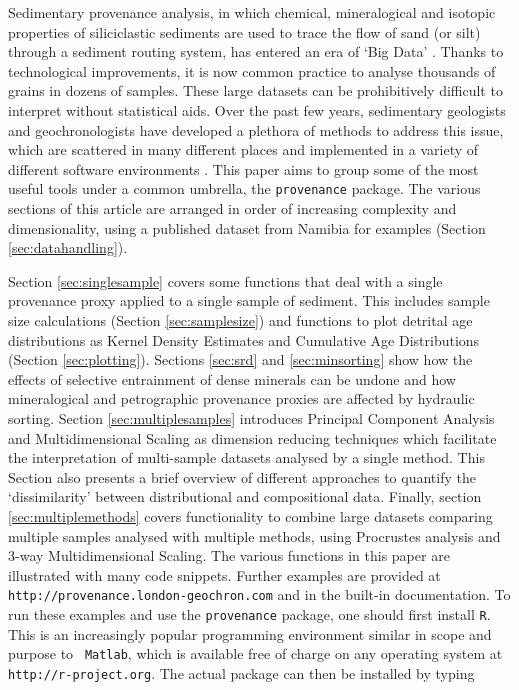 \documentclass{article}
\begin{document}
Sedimentary provenance analysis, in which chemical, mineralogical and
isotopic properties of siliciclastic sediments are used to trace the
flow of sand (or silt) through a sediment routing system, has entered
an era of `Big Data' \citep{vermeesch2015}. Thanks to technological
improvements, it is now common practice to analyse thousands of grains
in dozens of samples. These large datasets can be prohibitively
difficult to interpret without statistical aids. Over the past few
years, sedimentary geologists and geochronologists have developed a
plethora of methods to address this issue, which are scattered in many
different places and implemented in a variety of different software
environments \citep[e.g.,][]{ludwig2003, marshall1996, sircombe2004a,
  sircombe2004b, resentini2013, templ2011, vandenboogaart2008,
  vermeesch2004b, vermeesch2012b, vermeesch2013, vermeesch2015}. This
paper aims to group some of the most useful tools under a common
umbrella, the {\tt provenance} package. The various sections of this
article are arranged in order of increasing complexity and
dimensionality, using a published dataset from Namibia for examples
(Section \ref{sec:datahandling}).

Section \ref{sec:singlesample} covers some functions that deal with a
single provenance proxy applied to a single sample of sediment.  This
includes sample size calculations (Section \ref{sec:samplesize}) and
functions to plot detrital age distributions as Kernel Density
Estimates and Cumulative Age Distributions (Section
\ref{sec:plotting}). Sections \ref{sec:srd} and \ref{sec:minsorting}
show how the effects of selective entrainment of dense minerals can be
undone and how mineralogical and petrographic provenance proxies are
affected by hydraulic sorting.  Section \ref{sec:multiplesamples}
introduces Principal Component Analysis and Multidimensional Scaling
as dimension reducing techniques which facilitate the interpretation
of multi-sample datasets analysed by a single method. This Section
also presents a brief overview of different approaches to quantify the
`dissimilarity' between distributional and compositional
data. Finally, section \ref{sec:multiplemethods} covers functionality
to combine large datasets comparing multiple samples analysed with
multiple methods, using Procrustes analysis and 3-way Multidimensional
Scaling. The various functions in this paper are illustrated with many
code snippets. Further examples are provided at {\tt
  http://provenance.london-geochron.com} and in the built-in
documentation. To run these examples and use the {\tt provenance}
package, one should first install {\tt R}. This is an increasingly
popular programming environment similar in scope and purpose to {\tt
  Matlab}, which is available free of charge on any operating system
at {\tt http://r-project.org}. The actual package can then be
installed by typing
\end{document}
